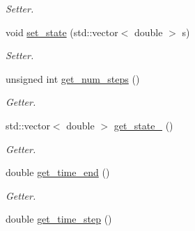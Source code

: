 \begin{DoxyCompactItemize}
\begin{DoxyCompactList}\small\item\em Setter. \end{DoxyCompactList}\item 
void \hyperlink{classprocess_a149855679fd1188aee51401c07ad35f7}{set\+\_\+state} (std\+::vector$<$ double $>$ s)\hypertarget{classprocess_a149855679fd1188aee51401c07ad35f7}{}\label{classprocess_a149855679fd1188aee51401c07ad35f7}

\begin{DoxyCompactList}\small\item\em Setter. \end{DoxyCompactList}\item 
unsigned int \hyperlink{classprocess_ac469abbf135402311103bf3ca1900748}{get\+\_\+num\+\_\+steps} ()\hypertarget{classprocess_ac469abbf135402311103bf3ca1900748}{}\label{classprocess_ac469abbf135402311103bf3ca1900748}

\begin{DoxyCompactList}\small\item\em Getter. \end{DoxyCompactList}\item 
std\+::vector$<$ double $>$ \hyperlink{classprocess_aef5d6a76efc3aa712f8cd41bf9438cba}{get\+\_\+state\+\_} ()\hypertarget{classprocess_aef5d6a76efc3aa712f8cd41bf9438cba}{}\label{classprocess_aef5d6a76efc3aa712f8cd41bf9438cba}

\begin{DoxyCompactList}\small\item\em Getter. \end{DoxyCompactList}\item 
double \hyperlink{classprocess_a047f0d44f3ec8ddd8d5edfcc09192615}{get\+\_\+time\+\_\+end} ()\hypertarget{classprocess_a047f0d44f3ec8ddd8d5edfcc09192615}{}\label{classprocess_a047f0d44f3ec8ddd8d5edfcc09192615}

\begin{DoxyCompactList}\small\item\em Getter. \end{DoxyCompactList}\item 
double \hyperlink{classprocess_acef251d897e6cec1fe68d1bb59094013}{get\+\_\+time\+\_\+step} ()\hypertarget{classprocess_acef251d897e6cec1fe68d1bb59094013}{}\label{classprocess_acef251d897e6cec1fe68d1bb59094013}


\end{DoxyCompactItemize}
